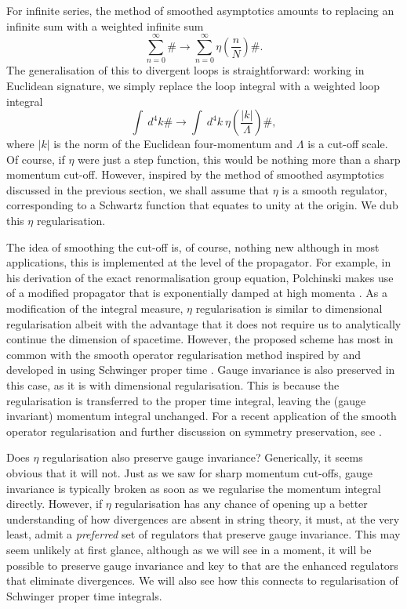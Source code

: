 \documentclass[12pt, letter]{article}
\def\be{\begin{equation}}
\def\ee{\end{equation}}
\begin{document}
For infinite series, the method of smoothed asymptotics amounts to replacing an infinite sum with a weighted infinite sum 
\be
\sum_{n=0}^\infty \# \rightarrow \sum_{n=0}^\infty \eta\left(\frac{n}{N} \right) \# .
\ee
The generalisation of this to divergent loops is straightforward: working in Euclidean signature, we simply replace the loop integral with a weighted loop integral
\begin{equation}
\int \ d^4k \# \rightarrow \int \ d^4k \   \eta \left(\frac{|k|}{\Lambda}\right) \# ,
\end{equation} 
where $|k|$ is the norm of the Euclidean four-momentum and $\Lambda$ is  a cut-off scale. Of course, if $\eta$ were just a step function, this would be nothing more than a sharp momentum cut-off. However, inspired by the method of smoothed asymptotics discussed in the previous section, we shall assume that $\eta$ is a smooth regulator, corresponding to a Schwartz function that equates to unity at the origin.  We dub this $\eta$ regularisation. 

The idea of smoothing the cut-off is, of course, nothing new although in most applications, this is implemented at the level of the propagator.  For example, in his derivation of the exact renormalisation group equation,  Polchinski makes use of a modified propagator that is exponentially damped at high momenta \citep{Polchinski84}.  As a modification of the integral measure,  $\eta$ regularisation is similar to dimensional regularisation albeit with the advantage that it does not require us to analytically continue the dimension of spacetime.  However, the proposed scheme has most in common with  the smooth operator regularisation method inspired by \cite{Ball88} and developed in \cite{Oleszczuk94,Liao96} using Schwinger proper time \cite{SchwingerPT}.  Gauge invariance is also preserved in this case, as it is with dimensional regularisation. This is because the regularisation is transferred to the proper time integral, leaving the (gauge invariant) momentum integral  unchanged.  For a recent application of the smooth operator regularisation and further discussion on symmetry preservation, see \cite{Xing:2022jtt}.


Does $\eta$ regularisation also preserve gauge invariance? Generically, it seems obvious that it will not.  Just as we saw for sharp momentum cut-offs, gauge invariance is typically broken as soon as we regularise the momentum integral directly.  However, if $\eta$ regularisation has any chance of opening up a better understanding of how divergences are absent in string theory, it must, at the very least,  admit a {\it preferred} set of regulators that preserve gauge invariance.  This may seem unlikely at first glance, although as we will see in a moment, it will be possible to preserve gauge invariance and key to that are the enhanced regulators that eliminate divergences.  We will also see how this connects to regularisation of Schwinger proper time integrals. 
\end{document}

